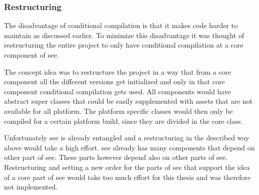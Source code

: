 \subsubsection{Restructuring}
The disadvantage of conditional compilation is that it makes code harder to maintain as discussed earlier.
To minimize this disadvantage it was thought of restructuring the entire project to only have conditional compilation at a core component of \gls{see}.

The concept idea was to restructure the project in a way that from a core component all the different versions get initialized and only in that core component conditional compilation gets used.
All components would have abstract super classes that could be easily supplemented with assets that are not available for all platform.
The platform specific classes would then only be compiled for a certain platform build, since they are divided in the core class.

Unfortunately \gls{see} is already entangled and a restructuring in the described way above would take a high effort.
\gls{see} already has many components that depend on other part of \gls{see}. 
These parts however depend also on other parts of \gls{see}. 
Restructuring and setting a new order for the parts of see that support the idea of a core part of \gls{see} would take too much effort for this thesis and was therefore not implemented.